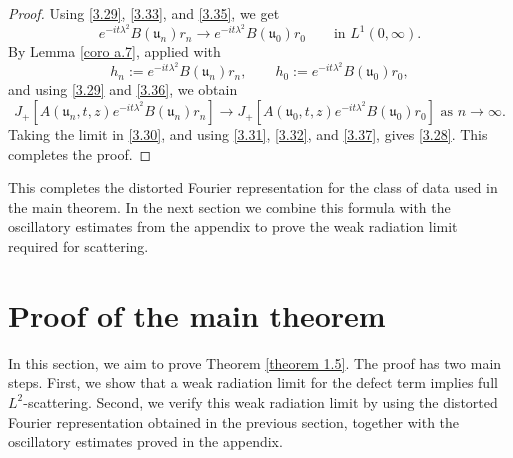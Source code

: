 \documentclass[10pt]{article}
\numberwithin{equation}{section}
\numberwithin{theorem}{section}
\begin{document}
\begin{proof}
Using \eqref{3.29}, \eqref{3.33}, and \eqref{3.35}, we get
\begin{equation}
\label{3.36}
e^{-it\lambda^2}B(\mathfrak u_n)r_n
\to
e^{-it\lambda^2}B(\mathfrak u_0)r_0
\qquad\text{in }L^1(0,\infty).
\end{equation}
By Lemma \ref{coro a.7}, applied with
\[
h_n:=e^{-it\lambda^2}B(\mathfrak u_n)r_n,
\qquad
h_0:=e^{-it\lambda^2}B(\mathfrak u_0)r_0,
\]
and using \eqref{3.29} and \eqref{3.36}, we obtain
\begin{equation}
\label{3.37}
J_+\left[
A(\mathfrak u_n,t,z)
e^{-it\lambda^2}B(\mathfrak u_n)r_n
\right] \longrightarrow
J_+\left[
A(\mathfrak u_0,t,z)
e^{-it\lambda^2}B(\mathfrak u_0)r_0
\right] \text{ as } n \to \infty.
\end{equation}
Taking the limit in \eqref{3.30}, and using \eqref{3.31}, \eqref{3.32}, and
\eqref{3.37}, gives \eqref{3.28}. This completes the proof.
\end{proof}
This completes the distorted Fourier representation for the class of data
used in the main theorem. In the next section we combine this formula with the
oscillatory estimates from the appendix to prove the weak radiation limit required for scattering.

\section{Proof of the main theorem}
\label{section 3}
In this section, we aim to prove Theorem
\ref{theorem 1.5}. The proof has two main steps. First, we show
that a weak radiation limit for the defect term implies full \(L^2\)-scattering.
Second, we verify this weak radiation limit by using the distorted Fourier representation
 obtained in the previous section, together with the oscillatory estimates
proved in the appendix.
\end{document}
